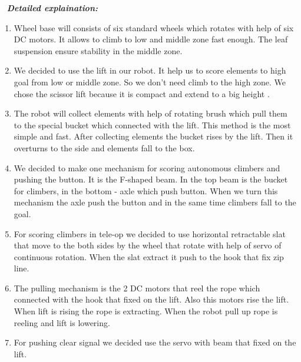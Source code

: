  \newline
\textit{\textbf{Detailed explaination:}}
\begin{enumerate}
	\item Wheel base will consists of six standard wheels which rotates with help of six DC motors. It allows to climb to low and middle zone fast enough. The leaf suspension ensure stability in the middle zone.
	
	\item We decided to use the lift in our robot. It help us to score elements to high goal from low or middle zone. So we don't need climb to the high zone. We chose the scissor lift because it is compact and extend to a big height .
	
	\item The robot will collect elements with help of rotating brush which pull them to the special bucket which connected with the lift. This method is the most simple and fast. After collecting elements the bucket rises by the lift. Then it overturns to the side and elements fall to the box.
	
	\item We decided to make one mechanism for scoring autonomous climbers and pushing the button. It is the F-shaped beam. In the top beam is the bucket for climbers, in the bottom - axle which push button. When we turn this mechanism the axle push the button and in the same time climbers fall to the goal.
	
	\item For scoring climbers in tele-op we decided to use horizontal retractable slat that move to the both sides by the wheel that rotate with help of servo of continuous rotation. When the slat extract it push to the hook that fix zip line.
	
	\item The pulling mechanism is the 2 DC motors that reel the rope which connected with the hook that fixed on the lift. Also this motors rise the lift. When lift is rising the rope is extracting. When the robot pull up rope is reeling and lift is lowering. 
	
	\item For pushing clear signal we decided use the servo with beam that fixed on the lift.

	
\end{enumerate}

 \newline


\fillpage
